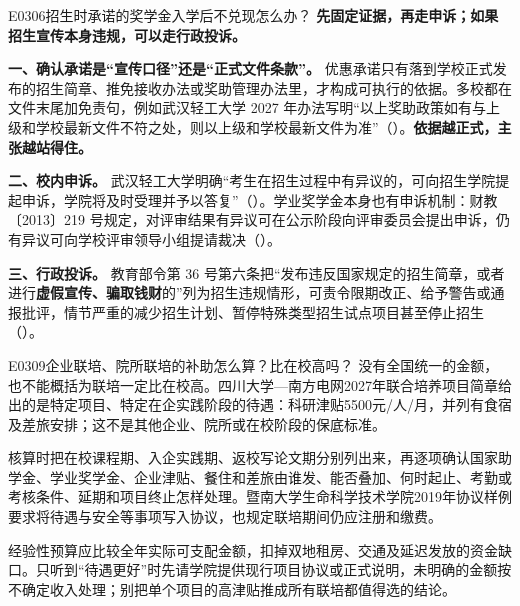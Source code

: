 \begin{qa}{E0306}{招生时承诺的奖学金入学后不兑现怎么办？}
\textbf{先固定证据，再走申诉；如果招生宣传本身违规，可以走行政投诉。}

\textbf{一、确认承诺是“宣传口径”还是“正式文件条款”。} 优惠承诺只有落到学校正式发布的招生简章、推免接收办法或奖助管理办法里，才构成可执行的依据。多校都在文件末尾加免责句，例如武汉轻工大学 2027 年办法写明“以上奖助政策如有与上级和学校最新文件不符之处，则以上级和学校最新文件为准”（）。\textbf{依据越正式，主张越站得住。}

\textbf{二、校内申诉。} 武汉轻工大学明确“考生在招生过程中有异议的，可向招生学院提起申诉，学院将及时受理并予以答复”（）。学业奖学金本身也有申诉机制：财教〔2013〕219 号规定，对评审结果有异议可在公示阶段向评审委员会提出申诉，仍有异议可向学校评审领导小组提请裁决（）。

\textbf{三、行政投诉。} 教育部令第 36 号第六条把“发布违反国家规定的招生简章，或者进行\textbf{虚假宣传、骗取钱财}的”列为招生违规情形，可责令限期改正、给予警告或通报批评，情节严重的减少招生计划、暂停特殊类型招生试点项目甚至停止招生（）。
\end{qa}

\begin{qa}{E0309}{企业联培、院所联培的补助怎么算？比在校高吗？}
没有全国统一的金额，也不能概括为联培一定比在校高。四川大学—南方电网2027年联合培养项目简章给出的是特定项目、特定在企实践阶段的待遇：科研津贴5500元/人/月，并列有食宿及差旅安排；这不是其他企业、院所或在校阶段的保底标准。

核算时把在校课程期、入企实践期、返校写论文期分别列出来，再逐项确认国家助学金、学业奖学金、企业津贴、餐住和差旅由谁发、能否叠加、何时起止、考勤或考核条件、延期和项目终止怎样处理。暨南大学生命科学技术学院2019年协议样例要求将待遇与安全等事项写入协议，也规定联培期间仍应注册和缴费。

经验性预算应比较全年实际可支配金额，扣掉双地租房、交通及延迟发放的资金缺口。只听到“待遇更好”时先请学院提供现行项目协议或正式说明，未明确的金额按不确定收入处理；别把单个项目的高津贴推成所有联培都值得选的结论。
\end{qa}

